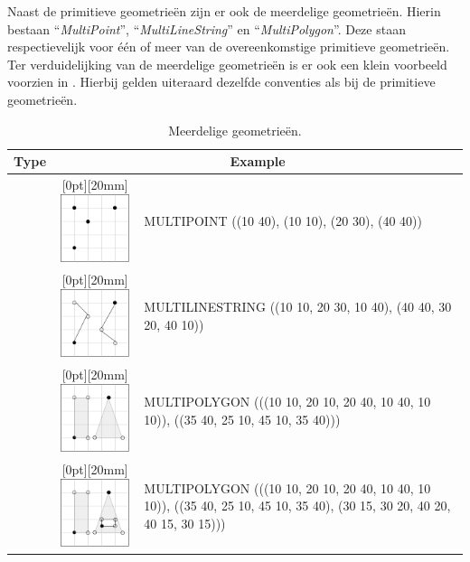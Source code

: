 Naast de primitieve geometrieën zijn er ook de meerdelige geometrieën. Hierin bestaan ``\textit{MultiPoint}'', ``\textit{MultiLineString}'' en ``\textit{MultiPolygon}''. Deze staan respectievelijk voor één of meer van de overeenkomstige primitieve geometrieën. Ter verduidelijking van de meerdelige geometrieën is er ook een klein voorbeeld voorzien in . Hierbij gelden uiteraard dezelfde conventies als bij de primitieve geometrieën.


\begin{table}[ht]
\centering
\begin{tabular}{ |l|c|p{8cm}| } 
 \hline
 \rowcolor{TableHeaderColor} Type & \multicolumn{2}{c|}{Example} \\ \hline
 
 \rowcolor{TableColor} \multirow{4.5}{*}{MultiPoint} & \raisebox{-\height+2mm}[0pt][20mm]{\includegraphics[width=20mm, height=20mm]{images/wkt_multipoint.png}} & MULTIPOINT ((10 40), (10 10), (20 30), (40 40)) \\ \hline
 
 \rowcolor{TableColor} \multirow{4.5}{*}{MultiLineString} & \raisebox{-\height+2mm}[0pt][20mm]{\includegraphics[width=20mm, height=20mm]{images/wkt_multiline.png}} & MULTILINESTRING ((10 10, 20 30, 10 40), (40 40, 30 20, 40 10)) \\ \hline
 
 \rowcolor{TableColor} & \raisebox{-\height+2mm}[0pt][20mm]{\includegraphics[width=20mm, height=20mm]{images/wkt_multipolygon1.png}} & MULTIPOLYGON (((10 10, 20 10, 20 40, 10 40, 10 10)), ((35 40, 25 10, 45 10, 35 40))) \\ \cline{2-3}
 
 \rowcolor{TableColor} \multirow{-2}{*}{MultiPolygon} & \raisebox{-\height+2mm}[0pt][20mm]{\includegraphics[width=20mm, height=20mm]{images/wkt_multipolygon2.png}} & MULTIPOLYGON (((10 10, 20 10, 20 40, 10 40, 10 10)), ((35 40, 25 10, 45 10, 35 40), (30 15, 30 20, 40 20, 40 15, 30 15))) \\ \hline
\end{tabular}
\caption{Meerdelige geometrieën.}
\label{tab:wkt_multipart}
\end{table}

